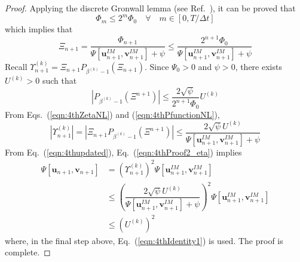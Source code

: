 \documentclass[review]{elsarticle}
\begin{document}
\begin{proof}
    Applying the discrete Gronwall lemma (see Ref.~\cite{clark1987short}), it can be proved that
    \begin{equation}
        \Phi_{m} \le 2^m \Phi_0 \quad \forall \quad m \in [0,T/\Delta t]
        \label{eqn:4thPhiRelation}
    \end{equation}  
    which implies that
    \begin{equation}
      \Xi_{n+1} = \dfrac{\Phi_{n+1}}{\Psi[\boldsymbol{u}_{n+1}^{IM},\boldsymbol{v}_{n+1}^{IM}]+\psi} \le \dfrac{2^{n+1}\Phi_0}{\Psi[\boldsymbol{u}_{n+1}^{IM},\boldsymbol{v}_{n+1}^{IM}]+\psi}
      \label{eqn:4thZetaNL}
    \end{equation}  
    Recall $\Upsilon^{(k)}_{n+1}=\Xi_{n+1} P_{\beta^{(k)}-1}(\Xi_{n+1})$.
    Since $\Psi_0>0$ and $\psi>0$, there exists $U^{(k)}>0$ such that 
      \begin{equation}
          |P_{\beta^{(k)}-1}(\Xi^{n+1})| \le \dfrac{2\sqrt{\psi}}{2^{n+1}\Phi_0}U^{(k)}
          \label{eqn:4thPfunctionNL}
      \end{equation} 
    From Eqs.~(\ref{eqn:4thZetaNL}) and (\ref{eqn:4thPfunctionNL}), 
    \begin{equation}
      |\Upsilon^{(k)}_{n+1}|=|\Xi_{n+1} P_{\beta^{(k)}-1}(\Xi^{n+1})|\le \dfrac{2\sqrt{\psi}U^{(k)}}{\Psi[\boldsymbol{u}_{n+1}^{IM},\boldsymbol{v}_{n+1}^{IM}]+\psi}
      \label{eqn:4thProof2_eta}
    \end{equation}  
    From Eq.~(\ref{eqn:4thupdated}), Eq.~(\ref{eqn:4thProof2_eta}) implies
    \begin{equation}
      \begin{array}{ll}
           \Psi[\boldsymbol{u}_{n+1},\boldsymbol{v}_{n+1}] &= \left(\Upsilon^{(k)}_{n+1}\right)^2 \Psi[\boldsymbol{u}_{n+1}^{IM},\boldsymbol{v}_{n+1}^{IM}]  \\
           &\le \left(\dfrac{2\sqrt{\psi}U^{(k)}}{\Psi[\boldsymbol{u}_{n+1}^{IM},\boldsymbol{v}_{n+1}^{IM}]+\psi}\right)^2 \Psi[\boldsymbol{u}_{n+1}^{IM},\boldsymbol{v}_{n+1}^{IM}] \\
           &\le \left( U^{(k)} \right)^2
      \end{array}        
    \end{equation}
    where, in the final step above, Eq.~(\ref{eqn:4thIdentity1}) is used.
    The proof is complete.
\end{proof}
\end{document}
